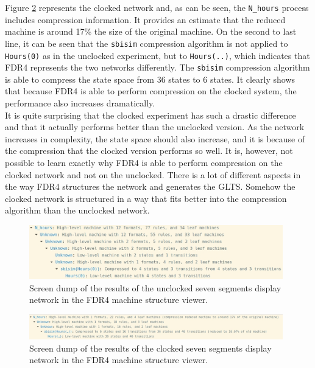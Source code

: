 Figure \ref{fig:clocked_compression} represents the clocked network and, as can be seen, the \texttt{N\_hours} process includes compression information. It provides an estimate that the reduced machine is around 17\% the size of the original machine. On the second to last line, it can be seen that the \texttt{sbisim} compression algorithm is not applied to \texttt{Hours(0)} as in the unclocked experiment, but to \texttt{Hours(..)}, which indicates that FDR4 represents the two networks differently. The \texttt{sbisim} compression algorithm is able to compress the state space from 36 states to 6 states. It clearly shows that because FDR4 is able to perform compression on the clocked system, the performance also increases dramatically.\\

It is quite surprising that the clocked experiment has such a drastic difference and that it actually performs better than the unclocked version. As the network increases in complexity, the state space should also increase, and it is because of the compression that the clocked version performs so well. It is, however, not possible to learn exactly why FDR4 is able to perform compression on the clocked network and not on the unclocked. There is a lot of different aspects in the way FDR4 structures the network and generates the GLTS. Somehow the clocked network is structured in a way that fits better into the compression algorithm than the unclocked network.
\begin{figure}
    \includegraphics[width=0.98\textwidth]{./figures/unclocked_compression.jpg}
\caption{Screen dump of the results of the unclocked seven segments display network in the FDR4 machine structure viewer.}
\label{fig:unclocked_compression}
\end{figure}
\begin{figure}
    \includegraphics[width=0.98\textwidth]{./figures/clocked_compression.jpg}
\caption{Screen dump of the results of the clocked seven segments display network in the FDR4 machine structure viewer.}
\label{fig:clocked_compression}
\end{figure}

